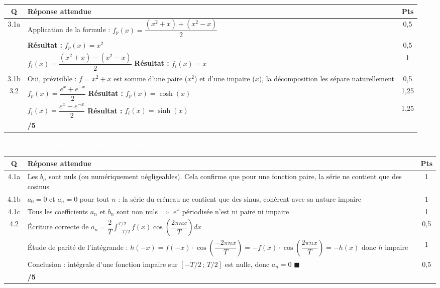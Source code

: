\documentclass[10pt,a4paper]{article}
\newcommand{\exotitle}[2]{%
  \noindent\colorbox{exoheader}{%
    \parbox{\dimexpr\linewidth-2\fboxsep\relax}{%
      \textcolor{white}{\textbf{\large #1 \hfill #2}}%
    }%
  }%
}
\begin{document}
\begin{tabularx}{\linewidth}{|c|X|c|}
	\hline
	\rowcolor{exolight}
	\textbf{Q} & \textbf{Réponse attendue} & \textbf{Pts} \\
	\hline
	\multirow{3}{*}{3.1a} & Application de la formule : $f_p(x) = \dfrac{(x^2+x)+(x^2-x)}{2}$ & 0,5 \\
	\cline{2-3}
	& \textbf{Résultat :} $f_p(x) = x^2$ & 0,5 \\
	\cline{2-3}
	& $f_i(x) = \dfrac{(x^2+x)-(x^2-x)}{2}$ \quad \textbf{Résultat :} $f_i(x) = x$ & 1 \\
	\hline
	3.1b & Oui, prévisible : $f = x^2 + x$ est somme d'une paire ($x^2$) et d'une impaire ($x$), la décomposition les sépare naturellement & 0,5 \\
	\hline
	\multirow{2}{*}{3.2} & $f_p(x) = \dfrac{e^x + e^{-x}}{2}$ \quad \textbf{Résultat :} $f_p(x) = \cosh(x)$ & 1,25 \\
	\cline{2-3}
	& $f_i(x) = \dfrac{e^x - e^{-x}}{2}$ \quad \textbf{Résultat :} $f_i(x) = \sinh(x)$ & 1,25 \\
	\hline
	\rowcolor{totalrow}
	\multicolumn{2}{|r|}{\textbf{Sous-total Exercice 3}} & \textbf{/5} \\
	\hline
\end{tabularx}

\vspace{3mm}

\newpage 


\exotitle{Exercice 4 : Lien avec les séries de Fourier}{/5 pts}

\vspace{1mm}

\begin{tabularx}{\linewidth}{|c|X|c|}
	\hline
	\rowcolor{exolight}
	\textbf{Q} & \textbf{Réponse attendue} & \textbf{Pts} \\
	\hline
	4.1a & Les $b_n$ sont nuls (ou numériquement négligeables). Cela confirme que pour une fonction paire, la série ne contient que des cosinus & 1 \\
	\hline
	4.1b & $a_0 = 0$ et $a_n = 0$ pour tout $n$ : la série du créneau ne contient que des sinus, cohérent avec sa nature impaire & 1 \\
	\hline
	4.1c & Tous les coefficients $a_n$ et $b_n$ sont non nuls $\Rightarrow$ $e^x$ périodisée n'est ni paire ni impaire & 1 \\
	\hline
	\multirow{3}{*}{4.2} & Écriture correcte de $a_n = \dfrac{2}{T}\displaystyle\int_{-T/2}^{T/2} f(x)\cos\!\left(\dfrac{2\pi n x}{T}\right)dx$ & 0,5 \\
	\cline{2-3}
	& Étude de parité de l'intégrande : $h(-x) = f(-x)\cdot\cos\!\left(\dfrac{-2\pi nx}{T}\right) = -f(x)\cdot\cos\!\left(\dfrac{2\pi nx}{T}\right) = -h(x)$ donc $h$ impaire & 1 \\
	\cline{2-3}
	& Conclusion : intégrale d'une fonction impaire sur $[-T/2\,;\,T/2]$ est nulle, donc $a_n = 0$ \hfill $\blacksquare$ & 0,5 \\
	\hline
	\rowcolor{totalrow}
	\multicolumn{2}{|r|}{\textbf{Sous-total Exercice 4}} & \textbf{/5} \\
	\hline
\end{tabularx}
\end{document}
